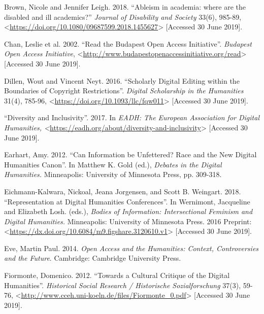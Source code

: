 \begin{paper}
\begin{flushleft}
Brown, Nicole and Jennifer Leigh. 2018. ``Ableism in academia: where are
the disabled and ill academics?'' \emph{Journal of Disability and
Society} 33(6), 985-89,
\textless{}\href{https://doi.org/10.1080/09687599.2018.1455627}{https://doi.org/10.1080/09687599.2018.1455627}\textgreater{} {[}Accessed 30 June 2019{]}.

Chan, Leslie et al. 2002. ``Read the Budapest Open Access Initiative''.
\emph{Budapest Open Access Initiative},
\textless{}\href{http://www.budapestopenaccessinitiative.org/read}{http://www.budapestopenaccessinitiative.org/read}\textgreater{}
{[}Accessed 30 June 2019{]}.

Dillen, Wout and Vincent Neyt. 2016. ``Scholarly Digital Editing within
the Boundaries of Copyright Restrictions''. \emph{Digital Scholarship in
the Humanities} 31(4), 785-96,
\textless{}\href{https://doi.org/10.1093/llc/fqw011}{https://doi.org/10.1093/llc/fqw011}\textgreater{} {[}Accessed
30 June 2019{]}.

``Diversity and Inclusivity''. 2017. In \emph{EADH: The European
Association for Digital Humanities,
\textless{}}\href{https://eadh.org/about/diversity-and-inclusivity}{https://eadh.org/about/diversity-and-inclusivity}\textgreater{}
{[}Accessed 30 June 2019{]}.

Earhart, Amy. 2012. ``Can Information be Unfettered? Race and the New
Digital Humanities Canon''. In Matthew K. Gold (ed.), \emph{Debates in
the Digital Humanities.} Minneapolis: University of Minnesota Press, pp.
309-318.

Eichmann-Kalwara, Nickoal, Jeana Jorgensen, and Scott B. Weingart. 2018.
``Representation at Digital Humanities Conferences''. In Wernimont,
Jacqueline and Elizabeth Losh. (eds.), \emph{Bodies of Information:
Intersectional Feminism and Digital Humanities.} Minneapolis: University
of Minnesota Press. 2016 Preprint:
\textless{}\href{https://dx.doi.org/10.6084/m9.figshare.3120610.v1}{https://dx.doi.org/10.6084/m9.figshare.3120610.v1}\textgreater{} {[}Accessed 30 June
2019{]}.

Eve, Martin Paul. 2014. \emph{Open Access and the Humanities: Context,
Controversies and the Future}. Cambridge: Cambridge University Press.

Fiormonte, Domenico. 2012. ``Towards a Cultural Critique of the Digital
Humanities''. \emph{Historical Social Research / Historische
Sozialforschung} 37(3), 59-76,
\textless{}\href{http://www.cceh.uni-koeln.de/files/Fiormonte\_0.pdf}{http://www.cceh.uni-koeln.de/files/Fiormonte\_0.pdf}\textgreater{}
{[}Accessed 30 June 2019{]}.


\end{flushleft}
\end{paper}
